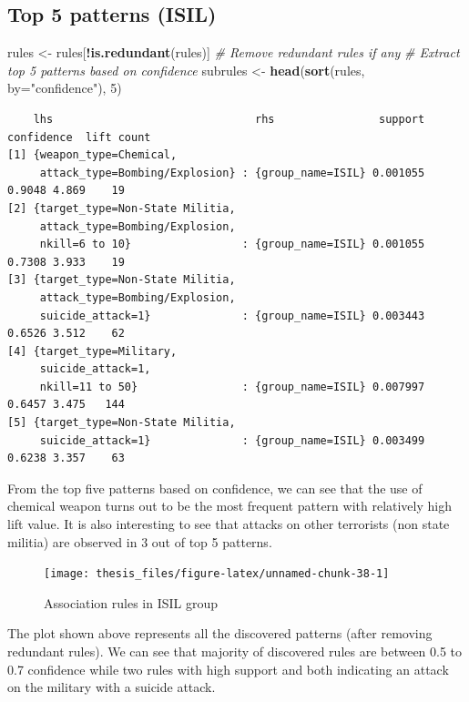 \documentclass[11pt,oneside,a4paper]{reedthesis}
\newenvironment{Shaded}{\begin{snugshade}}{\end{snugshade}}
\newcommand{\KeywordTok}[1]{\textcolor[rgb]{0.13,0.29,0.53}{\textbf{#1}}}
\newcommand{\DataTypeTok}[1]{\textcolor[rgb]{0.13,0.29,0.53}{#1}}
\newcommand{\DecValTok}[1]{\textcolor[rgb]{0.00,0.00,0.81}{#1}}
\newcommand{\StringTok}[1]{\textcolor[rgb]{0.31,0.60,0.02}{#1}}
\newcommand{\CommentTok}[1]{\textcolor[rgb]{0.56,0.35,0.01}{\textit{#1}}}
\newcommand{\OperatorTok}[1]{\textcolor[rgb]{0.81,0.36,0.00}{\textbf{#1}}}
\newcommand{\NormalTok}[1]{#1}
\begin{document}
\subsection{Top 5 patterns (ISIL)}\label{top-5-patterns-isil}
\begin{Shaded}
\begin{Highlighting}[]
\NormalTok{rules <-}\StringTok{ }\NormalTok{rules[}\OperatorTok{!}\KeywordTok{is.redundant}\NormalTok{(rules)] }\CommentTok{# Remove redundant rules if any }
\CommentTok{# Extract top 5 patterns based on confidence}
\NormalTok{subrules <-}\StringTok{ }\KeywordTok{head}\NormalTok{(}\KeywordTok{sort}\NormalTok{(rules, }\DataTypeTok{by=}\StringTok{"confidence"}\NormalTok{), }\DecValTok{5}\NormalTok{)}
\end{Highlighting}
\end{Shaded}
\begin{verbatim}
    lhs                               rhs                support confidence  lift count
[1] {weapon_type=Chemical,                                                             
     attack_type=Bombing/Explosion} : {group_name=ISIL} 0.001055     0.9048 4.869    19
[2] {target_type=Non-State Militia,                                                    
     attack_type=Bombing/Explosion,                                                    
     nkill=6 to 10}                 : {group_name=ISIL} 0.001055     0.7308 3.933    19
[3] {target_type=Non-State Militia,                                                    
     attack_type=Bombing/Explosion,                                                    
     suicide_attack=1}              : {group_name=ISIL} 0.003443     0.6526 3.512    62
[4] {target_type=Military,                                                             
     suicide_attack=1,                                                                 
     nkill=11 to 50}                : {group_name=ISIL} 0.007997     0.6457 3.475   144
[5] {target_type=Non-State Militia,                                                    
     suicide_attack=1}              : {group_name=ISIL} 0.003499     0.6238 3.357    63
\end{verbatim}
From the top five patterns based on confidence, we can see that the use
of chemical weapon turns out to be the most frequent pattern with
relatively high lift value. It is also interesting to see that attacks
on other terrorists (non state militia) are observed in 3 out of top 5
patterns.
\begin{figure}
\texttt{[image: thesis\_files/figure-latex/unnamed-chunk-38-1]} \caption{Association rules in ISIL group}\label{fig:unnamed-chunk-38}
\end{figure}
The plot shown above represents all the discovered patterns (after
removing redundant rules). We can see that majority of discovered rules
are between 0.5 to 0.7 confidence while two rules with high support and
both indicating an attack on the military with a suicide attack.
\end{document}
